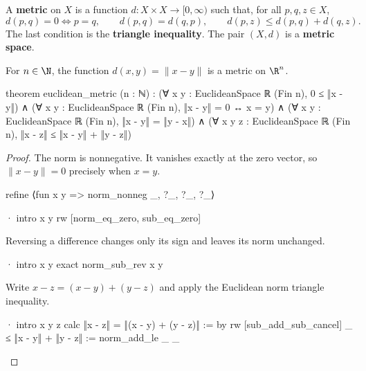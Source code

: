 \begin{definition}
  \label{ma:def:metric-space}
  A \textbf{metric} on $X$ is a function $d:X\times X\to[0,\infty)$ such that, for all $p,q,z\in
    X$,
  \[
    d(p,q)=0\iff p=q,\qquad d(p,q)=d(q,p),\qquad d(p,z)\leq d(p,q)+d(q,z).
  \]
  The last condition is the \textbf{triangle inequality}.
  The pair $(X,d)$ is a \textbf{metric space}.
\end{definition}

\begin{proposition}
  \label{ma:thm:standard-metric-on-Rn}
  For $n\in\N$, the function $d(x,y)=\|x-y\|$ is a metric on $\R^{n}$.

  \begin{lean}
    theorem euclidean_metric (n : ℕ) :
        (∀ x y : EuclideanSpace ℝ (Fin n), 0 ≤ ‖x - y‖) ∧
        (∀ x y : EuclideanSpace ℝ (Fin n), ‖x - y‖ = 0 ↔ x = y) ∧
        (∀ x y : EuclideanSpace ℝ (Fin n), ‖x - y‖ = ‖y - x‖) ∧
        (∀ x y z : EuclideanSpace ℝ (Fin n),
          ‖x - z‖ ≤ ‖x - y‖ + ‖y - z‖)
  \end{lean}
\end{proposition}

\begin{proof}
  The norm is nonnegative.
  It vanishes exactly at the zero vector, so $\|x-y\|=0$ precisely when $x=y$.

  \begin{lean}
    refine ⟨fun x y => norm_nonneg _, ?_, ?_, ?_⟩

    · intro x y
      rw [norm_eq_zero, sub_eq_zero]
  \end{lean}

  Reversing a difference changes only its sign and leaves its norm unchanged.

  \begin{lean}
    · intro x y
      exact norm_sub_rev x y
  \end{lean}

  Write $x-z=(x-y)+(y-z)$ and apply the Euclidean norm triangle inequality.

  \begin{lean}
    · intro x y z
      calc
        ‖x - z‖ = ‖(x - y) + (y - z)‖ := by
          rw [sub_add_sub_cancel]
        _ ≤ ‖x - y‖ + ‖y - z‖ := norm_add_le _ _
  \end{lean}

\end{proof}

